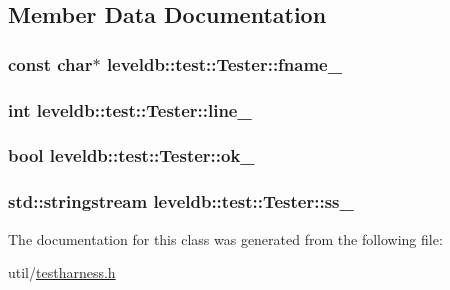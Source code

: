 \subsection{Member Data Documentation}
\hypertarget{classleveldb_1_1test_1_1_tester_ac31d6b42290908b68f6bc1957cc972d7}{}
\subsubsection[{fname\+\_\+}]{\setlength{\rightskip}{0pt plus 5cm}const char$\ast$ leveldb\+::test\+::\+Tester\+::fname\+\_\+\hspace{0.3cm}{\ttfamily [private]}}\label{classleveldb_1_1test_1_1_tester_ac31d6b42290908b68f6bc1957cc972d7}
\hypertarget{classleveldb_1_1test_1_1_tester_a6e4f6de0a9ec707e2d00a0671f605aa9}{}
\subsubsection[{line\+\_\+}]{\setlength{\rightskip}{0pt plus 5cm}int leveldb\+::test\+::\+Tester\+::line\+\_\+\hspace{0.3cm}{\ttfamily [private]}}\label{classleveldb_1_1test_1_1_tester_a6e4f6de0a9ec707e2d00a0671f605aa9}
\hypertarget{classleveldb_1_1test_1_1_tester_ae6eb51d7b83389a6c9c5dc46c53fb025}{}
\subsubsection[{ok\+\_\+}]{\setlength{\rightskip}{0pt plus 5cm}bool leveldb\+::test\+::\+Tester\+::ok\+\_\+\hspace{0.3cm}{\ttfamily [private]}}\label{classleveldb_1_1test_1_1_tester_ae6eb51d7b83389a6c9c5dc46c53fb025}
\hypertarget{classleveldb_1_1test_1_1_tester_abc209cb71659871eea9df987d61cf1e0}{}
\subsubsection[{ss\+\_\+}]{\setlength{\rightskip}{0pt plus 5cm}std\+::stringstream leveldb\+::test\+::\+Tester\+::ss\+\_\+\hspace{0.3cm}{\ttfamily [private]}}\label{classleveldb_1_1test_1_1_tester_abc209cb71659871eea9df987d61cf1e0}


The documentation for this class was generated from the following file\+:\begin{DoxyCompactItemize}
\item 
util/\hyperlink{testharness_8h}{testharness.\+h}\end{DoxyCompactItemize}
